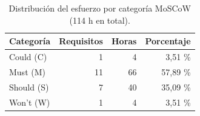 \begin{table}[H]
\centering
\footnotesize
\caption{Distribución del esfuerzo por categoría MoSCoW (114 h en total).}
\label{tab:moscow}
\begin{tabular}{@{}lrrr@{}}
\toprule
Categoría & Requisitos & Horas & Porcentaje \\
\midrule
Could (C) & 1 & 4 & 3,51 \% \\
Must (M) & 11 & 66 & 57,89 \% \\
Should (S) & 7 & 40 & 35,09 \% \\
Won't (W) & 1 & 4 & 3,51 \% \\
\bottomrule
\end{tabular}
\end{table}
